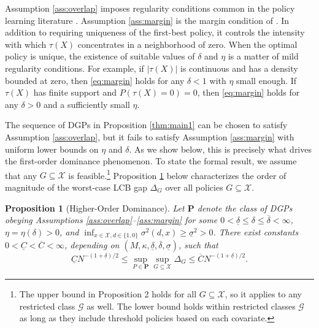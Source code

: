 \documentclass[12pt]{article}
\numberwithin{equation}{section}
\theoremstyle{plain}                         %
\newtheorem{proposition}{Proposition}
\theoremstyle{definition}                  %
\theoremstyle{remark}                      %
\begin{document}
 Assumption \ref{ass:overlap} imposes regularity conditions common in the policy learning literature \citep[see, e.g., ][]{KitagawaTetenov,MbakopTabord}.
Assumption \ref{ass:margin} is the margin condition of \citet{Tsybakov}. In addition to requiring uniqueness of the first-best policy, it controls the intensity with which $\tau(X)$ concentrates in a neighborhood of zero. When the optimal policy is unique, the existence of suitable values of $\delta$ and $\eta$ is a matter of mild regularity conditions. For example, if $|\tau(X)|$ is continuous and has a density bounded at zero, then \eqref{eq:margin} holds for any $\delta<1$ with $\eta$ small enough. If $\tau(X)$ has finite support and $P(\tau(X) = 0) = 0$, then \eqref{eq:margin} holds for any $\delta > 0$ and a sufficiently small $\eta$.


The sequence of DGPs in Proposition \ref{thm:main1} can be chosen to satisfy Assumption \ref{ass:overlap}, but it fails to satisfy Assumption \ref{ass:margin} with uniform lower bounds on $\eta$ and $\delta$. As we show below, this is precisely what drives the first-order dominance phenomenon. To state the formal result, we assume that any $G \subseteq \mathcal{X}$ is feasible.\footnote{The upper bound in Proposition 2 holds for all $G \subseteq \mathcal{X}$, so it applies to any restricted class $\mathcal{G}$ as well. The lower bound holds within restricted classes $\mathcal{G}$ as long as they include threshold policies based on each covariate.} Proposition \ref{thm:equivalence} below characterizes the order of magnitude of the worst-case LCB gap $\Delta_G$ over all policies $G \subseteq \mathcal{X}$. 


 
\begin{proposition}[Higher-Order Dominance]
\label{thm:equivalence}
Let $\mathbf{P}$ denote the class of DGPs obeying Assumptions \ref{ass:overlap}--\ref{ass:margin} for some $ 0 < \underline{\delta} \leq \delta \leq \overline{\delta} < \infty$, $\eta = \eta(\delta) > 0$, and $\inf_{x \in \mathcal{X}, d \in \{1,0\}} \sigma^2(d, x) \geq \underline{\sigma}^2>0$. There exist constants $0<\underline C<\overline C<\infty$, depending on $(M,\kappa, \underline{\delta}, \overline{\delta}, \underline{\sigma})$, such that
\begin{equation}
	\label{eq:mainresultupper}
\underline{C} N^{-(1 + \underline{\delta})/2} \leq \sup_{P \in \mathbf{P}} \sup_{G \subseteq \mathcal{X} } \Delta_G \leq \overline{C} N^{-(1 + \underline{\delta})/2}.
\end{equation}


\end{proposition}
\end{document}
